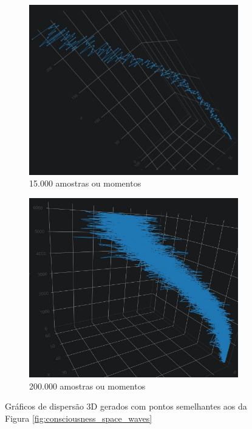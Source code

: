 	\begin{figure}[H]
	\centering
		\begin{subfigure}[H]{0.47\linewidth}
		\centering
		\includegraphics[width=1\linewidth]{sections/images/consciousness_space_3DScatter15000-10.jpg}
		\caption{15.000 amostras ou momentos}
		\label{fig:consciousness_space_3DScatter15000-10}
		\end{subfigure}
	
		\begin{subfigure}[H]{0.47\linewidth}
		\centering
		\includegraphics[width=1\linewidth]{sections/images/consciousness_space_3DScatter_200000-2.jpg}
		\caption{200.000 amostras ou momentos}
		\label{fig:consciousness_space_3DScatter_200000-2}
		\end{subfigure}%
	\caption{Gráficos de dispersão 3D gerados com pontos semelhantes aos da Figura \ref{fig:consciousness_space_waves}}
	\end{figure}
